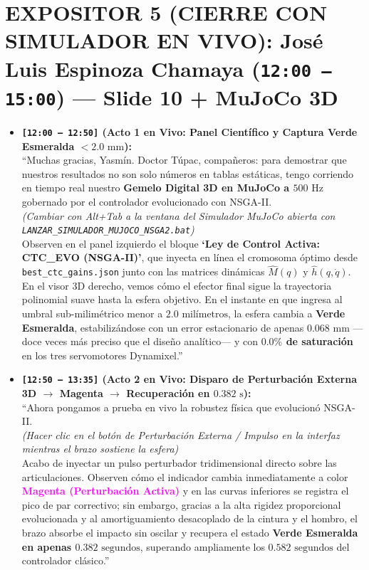 \documentclass[11pt,a4paper]{article}
\begin{document}
\section*{EXPOSITOR 5 (CIERRE CON SIMULADOR EN VIVO): José Luis Espinoza Chamaya (\texttt{12:00 -- 15:00}) — Slide 10 + MuJoCo 3D}
\begin{itemize}
    \item \textbf{\texttt{[12:00 -- 12:50]} (Acto 1 en Vivo: Panel Científico y Captura Verde Esmeralda $< 2.0\text{ mm}$):} \\
    ``Muchas gracias, Yasmín. Doctor Túpac, compañeros: para demostrar que nuestros resultados no son solo números en tablas estáticas, tengo corriendo en tiempo real nuestro \textbf{Gemelo Digital 3D en MuJoCo a $500\text{ Hz}$} gobernado por el controlador evolucionado con NSGA-II. \\
    \textit{(Cambiar con Alt+Tab a la ventana del Simulador MuJoCo abierta con \texttt{LANZAR\_SIMULADOR\_MUJOCO\_NSGA2.bat})} \\
    Observen en el panel izquierdo el bloque \textbf{`Ley de Control Activa: CTC\_EVO (NSGA-II)'}, que inyecta en línea el cromosoma óptimo desde \texttt{best\_ctc\_gains.json} junto con las matrices dinámicas $\hat{M}(q)$ y $\hat{h}(q,\dot{q})$. En el visor 3D derecho, vemos cómo el efector final sigue la trayectoria polinomial suave hasta la esfera objetivo. En el instante en que ingresa al umbral sub-milimétrico menor a \textbf{$2.0\text{ milímetros}$}, la esfera cambia a \textbf{\textcolor{unigreen}{Verde Esmeralda}}, estabilizándose con un error estacionario de apenas \textbf{$0.068\text{ mm}$} —doce veces más preciso que el diseño analítico— y con \textbf{$0.0\%$ de saturación} en los tres servomotores Dynamixel.''

    \item \textbf{\texttt{[12:50 -- 13:35]} (Acto 2 en Vivo: Disparo de Perturbación Externa 3D $\to$ Magenta $\to$ Recuperación en $0.382\text{ s}$):} \\
    ``Ahora pongamos a prueba en vivo la robustez física que evolucionó NSGA-II. \\
    \textit{(Hacer clic en el botón de Perturbación Externa / Impulso en la interfaz mientras el brazo sostiene la esfera)} \\
    Acabo de inyectar un pulso perturbador tridimensional directo sobre las articulaciones. Observen cómo el indicador cambia inmediatamente a color \textbf{\textcolor{magenta}{Magenta (Perturbación Activa)}} y en las curvas inferiores se registra el pico de par correctivo; sin embargo, gracias a la alta rigidez proporcional evolucionada y al amortiguamiento desacoplado de la cintura y el hombro, el brazo absorbe el impacto sin oscilar y recupera el estado \textbf{\textcolor{unigreen}{Verde Esmeralda} en apenas $0.382\text{ segundos}$}, superando ampliamente los $0.582\text{ segundos}$ del controlador clásico.''


\end{itemize}
\end{document}
